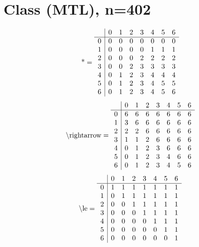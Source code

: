 \documentclass[11pt]{article}
\begin{document}
\section{Class (MTL), n=402}
\[\text{*} = 
\begin{array}{r | r r r r r r r}
 & 0 & 1 & 2 & 3 & 4 & 5 & 6 \\ \hline
0 & 0 & 0 & 0 & 0 & 0 & 0 & 0 \\
1 & 0 & 0 & 0 & 0 & 1 & 1 & 1 \\
2 & 0 & 0 & 0 & 2 & 2 & 2 & 2 \\
3 & 0 & 0 & 2 & 3 & 3 & 3 & 3 \\
4 & 0 & 1 & 2 & 3 & 4 & 4 & 4 \\
5 & 0 & 1 & 2 & 3 & 4 & 5 & 5 \\
6 & 0 & 1 & 2 & 3 & 4 & 5 & 6 \\
\end{array}
\]
\[\text{\textbackslash rightarrow} = 
\begin{array}{r | r r r r r r r}
 & 0 & 1 & 2 & 3 & 4 & 5 & 6 \\ \hline
0 & 6 & 6 & 6 & 6 & 6 & 6 & 6 \\
1 & 3 & 6 & 6 & 6 & 6 & 6 & 6 \\
2 & 2 & 2 & 6 & 6 & 6 & 6 & 6 \\
3 & 1 & 1 & 2 & 6 & 6 & 6 & 6 \\
4 & 0 & 1 & 2 & 3 & 6 & 6 & 6 \\
5 & 0 & 1 & 2 & 3 & 4 & 6 & 6 \\
6 & 0 & 1 & 2 & 3 & 4 & 5 & 6 \\
\end{array}
\]
\[\text{\textbackslash le} = 
\begin{array}{r | r r r r r r r}
 & 0 & 1 & 2 & 3 & 4 & 5 & 6 \\ \hline
0 & 1 & 1 & 1 & 1 & 1 & 1 & 1 \\
1 & 0 & 1 & 1 & 1 & 1 & 1 & 1 \\
2 & 0 & 0 & 1 & 1 & 1 & 1 & 1 \\
3 & 0 & 0 & 0 & 1 & 1 & 1 & 1 \\
4 & 0 & 0 & 0 & 0 & 1 & 1 & 1 \\
5 & 0 & 0 & 0 & 0 & 0 & 1 & 1 \\
6 & 0 & 0 & 0 & 0 & 0 & 0 & 1 \\
\end{array}
\]
\end{document}
